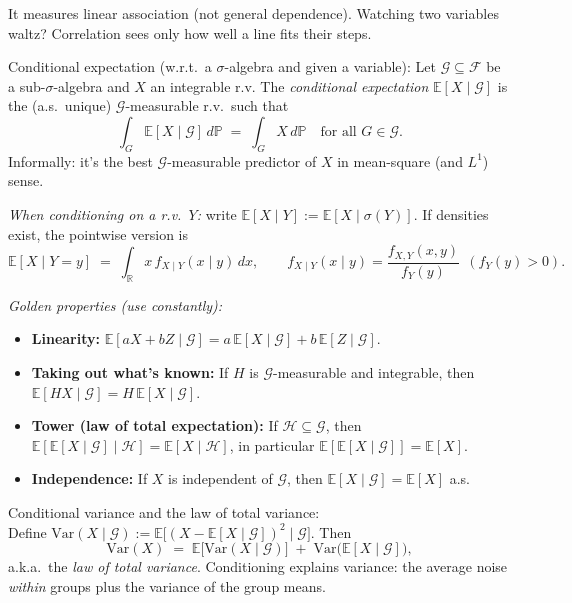 It measures linear association (not general dependence). Watching two variables waltz? Correlation sees only how well a line fits their steps.

\begin{definition}
Conditional expectation (w.r.t.\ a $\sigma$-algebra and given a variable):
Let $\mathcal{G}\subseteq \mathcal{F}$ be a sub-$\sigma$-algebra and $X$ an integrable r.v. 
The \emph{conditional expectation} $\mathbb{E}[X\mid \mathcal{G}]$ is the (a.s.\ unique) $\mathcal{G}$-measurable r.v.\ such that
\[
\int_G \mathbb{E}[X\mid \mathcal{G}]\, d\mathbb{P}
\;=\;
\int_G X\, d\mathbb{P}
\quad\text{for all }G\in \mathcal{G}.
\]
Informally: it’s the best $\mathcal{G}$-measurable predictor of $X$ in mean-square (and $L^1$) sense.

\textit{When conditioning on a r.v.\ $Y$:} write $\mathbb{E}[X\mid Y] := \mathbb{E}[X\mid \sigma(Y)]$.  
If densities exist, the pointwise version is
\[
\mathbb{E}[X\mid Y=y] \;=\; \int_{\mathbb{R}} x\, f_{X\mid Y}(x\mid y)\,dx,
\qquad
f_{X\mid Y}(x\mid y)=\frac{f_{X,Y}(x,y)}{f_Y(y)}\ \ (f_Y(y)>0).
\]
\end{definition}

\textit{Golden properties (use constantly):}
\begin{itemize}
\item \textbf{Linearity:} $\mathbb{E}[aX+bZ\mid\mathcal{G}]=a\,\mathbb{E}[X\mid\mathcal{G}]+b\,\mathbb{E}[Z\mid\mathcal{G}]$.
\item \textbf{Taking out what’s known:} If $H$ is $\mathcal{G}$-measurable and integrable, then 
$\mathbb{E}[HX\mid\mathcal{G}]=H\,\mathbb{E}[X\mid\mathcal{G}]$.
\item \textbf{Tower (law of total expectation):} If $\mathcal{H}\subseteq\mathcal{G}$, then 
$\mathbb{E}[\mathbb{E}[X\mid\mathcal{G}]\mid\mathcal{H}] = \mathbb{E}[X\mid\mathcal{H}]$, in particular $\mathbb{E}[\mathbb{E}[X\mid\mathcal{G}]]=\mathbb{E}[X]$.
\item \textbf{Independence:} If $X$ is independent of $\mathcal{G}$, then $\mathbb{E}[X\mid\mathcal{G}] = \mathbb{E}[X]$ a.s.
\end{itemize}

\begin{definition}
Conditional variance and the law of total variance: \\
Define $\mathrm{Var}(X\mid \mathcal{G}):=\mathbb{E}\!\big[(X-\mathbb{E}[X\mid\mathcal{G}])^2\mid\mathcal{G}\big]$.  
Then
\[
\mathrm{Var}(X)
\;=\; \mathbb{E}\big[\mathrm{Var}(X\mid \mathcal{G})\big]
\;+\; \mathrm{Var}\big(\mathbb{E}[X\mid \mathcal{G}]\big),
\]
a.k.a.\ the \emph{law of total variance}.  
Conditioning explains variance: the average noise \emph{within} groups plus the variance of the group means.
\end{definition}

